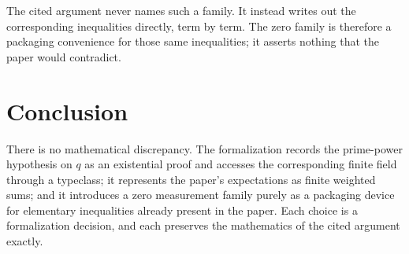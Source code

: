 \documentclass{article}
\begin{document}
The cited argument never names such a family. It instead writes out
the corresponding inequalities directly, term by term. The zero
family is therefore a packaging convenience for those same
inequalities; it asserts nothing that the paper would contradict.

\section{Conclusion}

There is no mathematical discrepancy. The formalization records the
prime-power hypothesis on $q$ as an existential proof and accesses
the corresponding finite field through a typeclass; it represents the
paper's expectations as finite weighted sums; and it introduces a
zero measurement family purely as a packaging device for elementary
inequalities already present in the paper. Each choice is a
formalization decision, and each preserves the mathematics of the
cited argument exactly.



\end{document}
